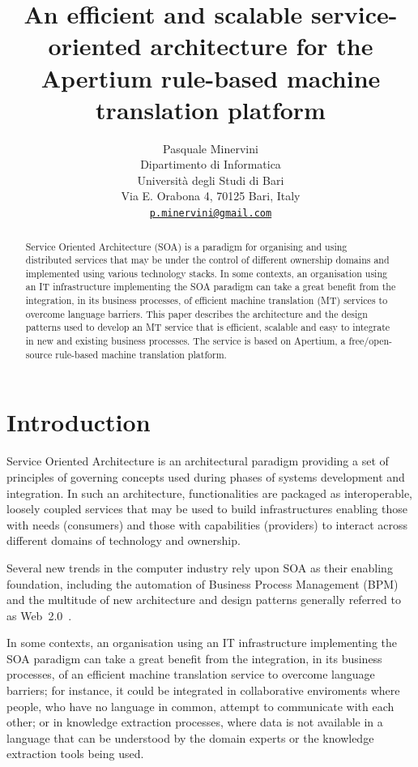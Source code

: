 \documentclass[11pt]{article}
\title{An efficient and scalable service-oriented architecture for the Apertium rule-based machine translation platform}
\author{Pasquale Minervini\\
  Dipartimento di Informatica\\
  Università degli Studi di Bari\\
  Via E. Orabona 4, 70125 Bari, Italy\\
  \href{mailto:p.minervini@gmail.com}{\nolinkurl{p.minervini@gmail.com}}}
\date{}
\begin{document}
\maketitle

\begin{abstract}
Service Oriented Architecture (SOA) is a paradigm for organising and using distributed services that may be under the control of different ownership domains and implemented using various technology stacks. In some contexts, an organisation using an IT infrastructure implementing the SOA paradigm can take a great benefit from the integration, in its business processes, of efficient machine translation (MT) services to overcome language barriers. This paper describes the architecture and the design patterns used to develop an MT service that is efficient, scalable and easy to integrate in new and existing business processes. The service is based on Apertium, a free/open-source rule-based machine translation platform.
\end{abstract}


\section{Introduction}

Service Oriented Architecture is an architectural paradigm providing a set of principles of governing concepts used during phases of systems development and integration. In such an architecture, functionalities are packaged as interoperable, loosely coupled services that may be used to build infrastructures enabling those with needs (consumers) and those with capabilities (providers) to interact across different domains of technology and ownership.

Several new trends in the computer industry rely upon SOA as their enabling foundation, including the automation of Business Process Management (BPM) and the multitude of new architecture and design patterns generally referred to as Web~2.0~\citep{web20}.

In some contexts, an organisation using an IT infrastructure implementing the SOA paradigm can take a great benefit from the integration, in its business processes, of an efficient machine translation service to overcome language barriers; for instance, it could be integrated in collaborative enviroments where people, who have no language in common, attempt to communicate with each other; or in knowledge extraction processes, where data is not available in a language that can be understood by the domain experts or the knowledge extraction tools being used.
\end{document}
